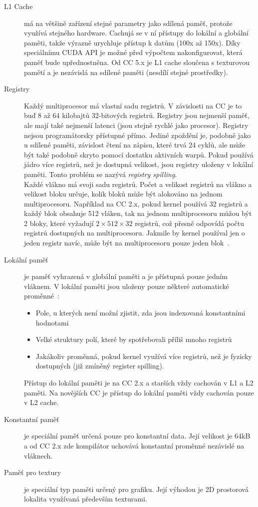 \begin{description}
\item[L1 Cache] má na většině zařízení stejné parametry jako sdílená paměť, protože využívá stejného hardware. Cachujá se v ní přístupy do lokální a globální paměti, takže výrazně urychluje přístup k datům (100x až 150x). Díky speciálnímu CUDA API je možné před výpočtem nakonfigurovat, která paměť bude upřednostněna. Od CC 5.x je L1 cache sloučena s texturovou pamětí a je nezávislá na sdílené paměti (nesdílí stejné prostředky).

\item[Registry] Každý multiprocesor má vlastní sadu registrů. V závislosti na CC je to buď 8 až 64 kilobajtů 32-bitových registrů. Registry jsou nejmenší paměť, ale mají také nejmenší latenci (jsou stejně rychlé jako procesor). Registry nejsou programátorsky přístupné přímo. Jediné zpoždění je, podobně jako u sdílené paměti, závislost čtení na zápisu, které trvá 24 cyklů, ale může být také podobně skryto pomocí dostatku aktivních warpů. Pokud používá jádro více registrů, než je dostupná velikost, jsou registry uloženy v lokální paměti. Tonto problém se nazývá \textit{registry spilling}.\\

Každé vlákno má svoji sadu registrů. Počet a velikost registrů na vlákno a velikost bloku určuje, kolik bloků může být alokováno na jednom multiprocesoru. Například na CC 2.x, pokud kernel používá 32 registrů a každý blok obsahuje 512 vláken, tak na jednom multiprocesoru můžou být 2 bloky, které vyžadují $2\times512\times32$ registrů, což přesně odpovídá počtu registrů dostupných na multiprocesoru. Jakmile by kernel používal jen o jeden registr navíc, může být na multiprocesoru pouze jeden blok~\cite{CUDAGuide}.

\item[Lokální paměť] je paměť vyhrazená v globální paměti a je přístupná pouze jedním vláknem. V lokální paměti jsou uloženy pouze některé automatické proměnné~\cite{CUDAGuide}:
\begin{itemize}
\item Pole, u kterých není možní zjistit, zda jsou indexovaná konstantními hodnotami
\item Velké struktury polí, které by spotřebovali příliš mnoho registrů
\item Jakákoliv proměnná, pokud kernel využívá více registrů, než je fyzicky dostupných (již zmíněný register spilling).
\end{itemize}
Přístup do lokální paměti je na CC 2.x a starších vždy cachován v L1 a L2 paměti. Na novějších CC je přístup do lokální paměti vždy cachován pouze v L2 cache.
\item[Konstantní paměť] je speciální paměť určená pouze pro konstantní data. Její velikost je 64kB a od CC 2.x zde kompilátor uchovává konstantní proměnné nezávislé na vláknech. 
\item[Paměť pro textury] je speciální typ paměti určený pro grafiku. Její výhodou je 2D prostorová lokalita využívaná především texturami.
\end{description}

